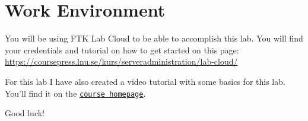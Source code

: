 \documentclass[paper=a4, fontsize=11pt]{report} %
\begin{document}
\section{Work Environment}
\label{environment}

You will be using FTK Lab Cloud to be able to accomplish this lab. You will find your credentials and tutorial on how to get started on this page: \href{https://coursepress.lnu.se/kurs/serveradministration/lab-cloud/}{https://coursepress.lnu.se/kurs/serveradministration/lab-cloud/}

For this lab I have also created a video tutorial with some basics for this lab. You'll find it on the \texttt{\href{https://coursepress.lnu.se/kurs/serveradministration/moduler/module-3/laboration}{course homepage}}.

Good luck!
\end{document}
